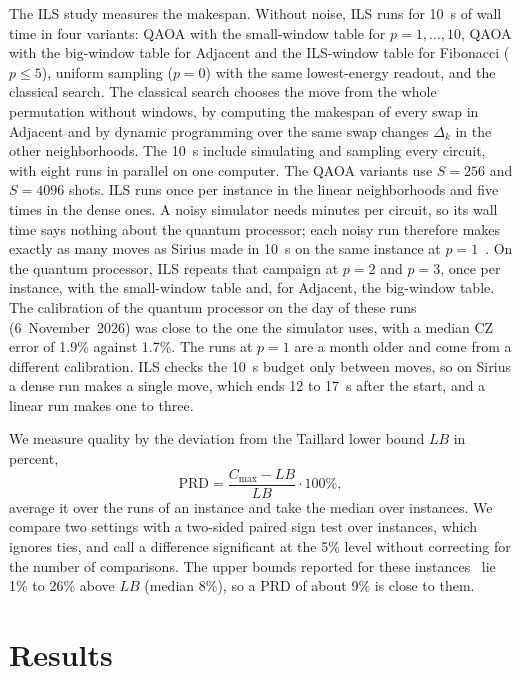 \documentclass[runningheads]{llncs}
\begin{document}
The ILS study measures the makespan. Without noise, ILS runs for 10~s of wall
time in four variants: QAOA with the small-window table for
$p = 1, \dots, 10$, QAOA with the big-window table for Adjacent and the
ILS-window table for Fibonacci ($p \le 5$), uniform sampling ($p = 0$) with
the same lowest-energy readout, and the classical search. The classical
search chooses the move from the whole permutation without windows, by
computing the makespan of every swap in Adjacent and by dynamic programming
over the same swap changes $\Delta_k$ in the other neighborhoods. The 10~s
include simulating and sampling every circuit, with eight runs in parallel on
one computer. The QAOA variants use $S = 256$ and $S = 4096$ shots. ILS runs
once per instance in the linear neighborhoods and five times in the dense
ones. A noisy
simulator needs minutes per circuit, so its wall time says nothing about the
quantum processor; each noisy run therefore makes exactly as many moves as Sirius made
in 10~s on the same instance at $p = 1$~\cite{wojewodzki2026aciids}. On the
quantum processor, ILS repeats that campaign at $p = 2$ and $p = 3$, once per instance,
with the small-window table and, for Adjacent, the big-window table. The calibration of the quantum processor on the day of these runs (6~November~2026) was
close to the one the simulator uses, with a median CZ error of 1.9\% against
1.7\%. The runs at $p = 1$ are a month older and come from a different
calibration. ILS checks the 10~s budget only between moves, so on Sirius a
dense run makes a single move, which ends 12 to 17~s after the start, and a
linear run makes one to three.

We measure quality by the deviation from the Taillard lower bound $LB$ in
percent,
\begin{equation}
  \mathrm{PRD} = \frac{C_{\max} - LB}{LB} \cdot 100\% ,
\end{equation}
average it over the runs of an instance and take the median over instances.
We compare two settings with a two-sided paired sign test over instances,
which ignores ties, and call a difference significant at the 5\% level
without correcting for the number of comparisons. The upper bounds reported for these
instances~\cite{taillard1993} lie 1\% to 26\% above $LB$ (median 8\%), so a PRD of about 9\% is close to them.

\section{Results}
\end{document}
